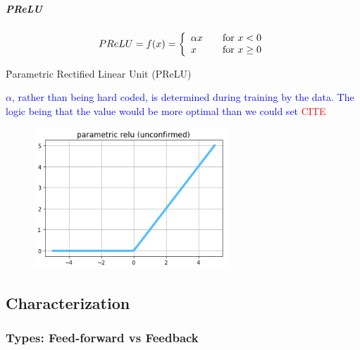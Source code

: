 \subparagraph{PReLU}

\begin{equ}[!ht]
	\begin{equation}
	{
		PReLU = f(x) = \left\{
		\begin{array}{ll}
		\alpha x & \quad $for$ \ x < 0 \\
		x & \quad $for$ \ x \ge 0
		\end{array}
		\right.
	}
	\label{eq:act_prelu_def}
	\end{equation}
	\caption{where $\alpha$ is a parameterized --- a learned parameter from training.}
\end{equ}

\r{Parametric Rectified Linear Unit (PReLU) \cite{he2015delving}}

\textcolor{blue}{$\alpha$, rather than being hard coded, is determined during training by the data. The logic being that the value would be more optimal than we could set \textcolor{red}{CITE}}

\begin{figure}
	\centering
	\includegraphics[width=0.65\textwidth]{./sync_imgs/act/notsmooth/prelu.png}
	\label{fig:act_notsmooth_prelu}
\end{figure}









\subsection{Characterization}

\subsubsection{Types: Feed-forward vs Feedback}

